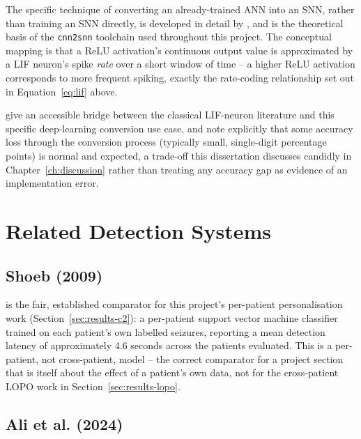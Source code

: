 The specific technique of converting an already-trained ANN into an SNN, rather than training an SNN directly, is developed in detail by \citet{rueckauer2017}, and is the theoretical basis of the \texttt{cnn2snn} toolchain used throughout this project. The conceptual mapping is that a ReLU activation's continuous output value is approximated by a LIF neuron's spike \emph{rate} over a short window of time -- a higher ReLU activation corresponds to more frequent spiking, exactly the rate-coding relationship set out in Equation~\ref{eq:lif} above.


\citet{pfeiffer2018} give an accessible bridge between the classical LIF-neuron literature and this specific deep-learning conversion use case, and note explicitly that some accuracy loss through the conversion process (typically small, single-digit percentage points) is normal and expected, a trade-off this dissertation discusses candidly in Chapter~\ref{ch:discussion} rather than treating any accuracy gap as evidence of an implementation error.

\section{Related Detection Systems}

\subsection{Shoeb (2009)}

\citet{shoeb2009} is the fair, established comparator for this project's per-patient personalisation work (Section~\ref{sec:results-c2}): a per-patient support vector machine classifier trained on each patient's own labelled seizures, reporting a mean detection latency of approximately 4.6 seconds across the patients evaluated. This is a per-patient, not cross-patient, model -- the correct comparator for a project section that is itself about the effect of a patient's own data, not for the cross-patient LOPO work in Section~\ref{sec:results-lopo}.

\subsection{Ali et al. (2024)}

